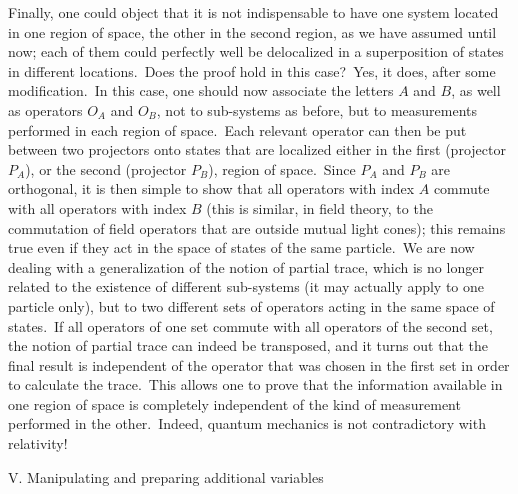 \documentclass[12pt,onecolumn]{article}%
\begin{document}
Finally, one could object that it is not indispensable to have one system
located in one region of space, the other in the second region, as we have
assumed until now; each of them could perfectly well be delocalized in a
superposition of states in different locations.\ Does the proof hold in this
case?\ Yes, it does, after some modification.\ In this case, one should now
associate the letters $A$ and $B$, as well as operators $O_{A}$ and $O_{B}$,
not to sub-systems as before, but to measurements performed in each region of
space.\ Each relevant operator can then be put between two projectors onto
states that are localized either in the first (projector $P_{A}$), or the
second (projector $P_{B}$), region of space.\ Since $P_{A}$ and $P_{B}$ are
orthogonal, it is then simple to show that all operators with index $A$
commute with all operators with index $B$ (this is similar, in field theory,
to the commutation of field operators that are outside mutual light cones);
this remains true even if they act in the space of states of the same
particle.\ We are now dealing with a generalization of the notion of partial
trace, which is no longer related to the existence of different sub-systems
(it may actually apply to one particle only), but to two different sets of
operators acting in the same space of states.\ If all operators of one set
commute with all operators of the second set, the notion of partial trace can
indeed be transposed, and it turns out that the final result is independent of
the operator that was chosen in the first set in order to calculate the
trace.\ This allows one to prove that the information available in one region
of space is completely independent of the kind of measurement performed in the
other.\ Indeed, quantum mechanics is not contradictory with relativity!

\bigskip

\begin{center}
V. Manipulating and preparing additional variables

\bigskip
\end{center}
\end{document}
